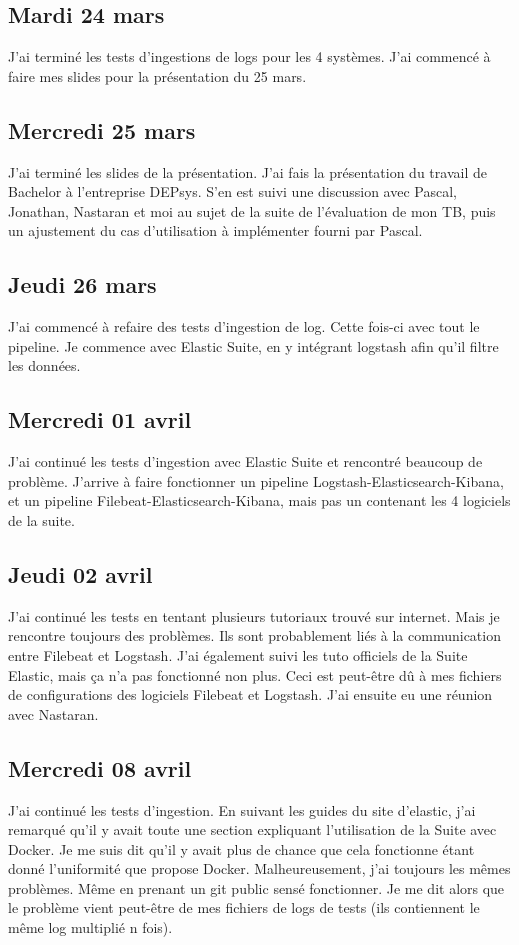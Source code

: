 \documentclass[paper=a4, fontsize=11pt]{scrartcl}
\begin{document}
\subsection{Mardi 24 mars}
    J'ai terminé les tests d'ingestions de logs pour les 4 systèmes. J'ai commencé à faire mes slides pour la présentation du 25 mars.
\subsection{Mercredi 25 mars}
    J'ai terminé les slides de la présentation. J'ai fais la présentation du travail de Bachelor à l'entreprise DEPsys. S'en est suivi une discussion avec Pascal, Jonathan, Nastaran et moi au sujet de la suite de l'évaluation de mon TB, puis un ajustement du cas d'utilisation à implémenter fourni par Pascal.
\subsection{Jeudi 26 mars}
    J'ai commencé à refaire des tests d'ingestion de log. Cette fois-ci avec tout le pipeline. Je commence avec Elastic Suite, en y intégrant logstash afin qu'il filtre les données.
\subsection{Mercredi 01 avril}
    J'ai continué les tests d'ingestion avec Elastic Suite et rencontré beaucoup de problème. J'arrive à faire fonctionner un pipeline Logstash-Elasticsearch-Kibana, et un pipeline Filebeat-Elasticsearch-Kibana, mais pas un contenant les 4 logiciels de la suite.
\subsection{Jeudi 02 avril}
    J'ai continué les tests en tentant plusieurs tutoriaux trouvé sur internet. Mais je rencontre toujours des problèmes. Ils sont probablement liés à la communication entre Filebeat et Logstash. J'ai également suivi les tuto officiels de la Suite Elastic, mais ça n'a pas fonctionné non plus. Ceci est peut-être dû à mes fichiers de configurations des logiciels Filebeat et Logstash. J'ai ensuite eu une réunion avec Nastaran.
\subsection{Mercredi 08 avril}
    J'ai continué les tests d'ingestion. En suivant les guides du site d'elastic, j'ai remarqué qu'il y avait toute une section expliquant l'utilisation de la Suite avec Docker. Je me suis dit qu'il y avait plus de chance que cela fonctionne étant donné l'uniformité que propose Docker. Malheureusement, j'ai toujours les mêmes problèmes. Même en prenant un git public sensé fonctionner. Je me dit alors que le problème vient peut-être de mes fichiers de logs de tests (ils contiennent le même log multiplié n fois).
\end{document}
